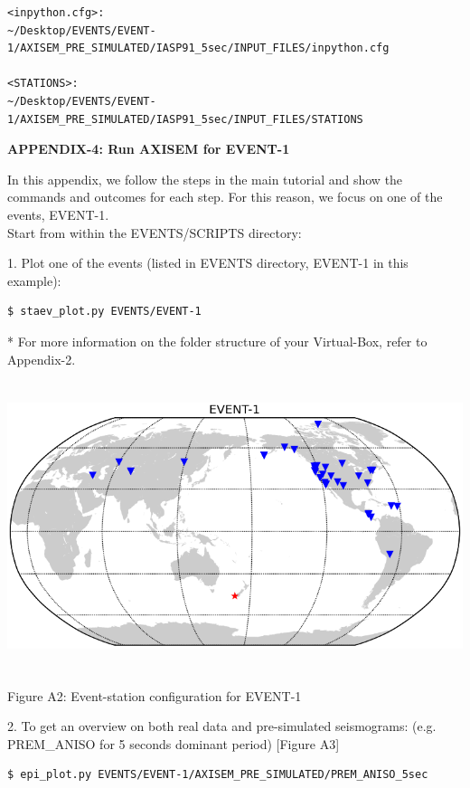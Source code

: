 \documentclass{article}
\begin{document}
\begin{lstlisting}
<inpython.cfg>: 
~/Desktop/EVENTS/EVENT-1/AXISEM_PRE_SIMULATED/IASP91_5sec/INPUT_FILES/inpython.cfg

<STATIONS>:
~/Desktop/EVENTS/EVENT-1/AXISEM_PRE_SIMULATED/IASP91_5sec/INPUT_FILES/STATIONS
\end{lstlisting}

\newpage

{\large{}\textbf{APPENDIX-4: Run AXISEM for EVENT-1}}

In this appendix, we follow the steps in the main tutorial and show the commands 
and outcomes for each step. For this reason, we focus on one of the events, EVENT-1. \\

Start from within the EVENTS/SCRIPTS directory:

1. Plot one of the events (listed in EVENTS directory, EVENT-1 in this example):
\begin{lstlisting}
$ staev_plot.py EVENTS/EVENT-1
\end{lstlisting}
* For more information on the folder structure of your Virtual-Box, refer to Appendix-2.

\begin{center}
\includegraphics[width=444pt, height=240pt, keepaspectratio=true]{AXISEMTutorial-fig006.png}

{\small{}Figure A2: Event-station configuration for EVENT-1}
\end{center}

\baselineskip=13pt
\leftskip=0pt
2. To get an overview on both real data and pre-simulated seismograms: (e.g. PREM\_ANISO 
for 5 seconds dominant period) [Figure A3]
\begin{lstlisting}
$ epi_plot.py EVENTS/EVENT-1/AXISEM_PRE_SIMULATED/PREM_ANISO_5sec
\end{lstlisting}
\end{document}
